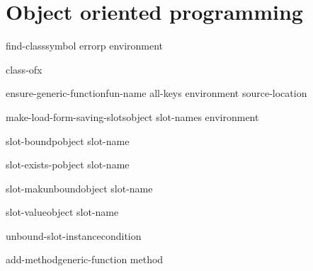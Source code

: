 \chapter{Object oriented programming}

\begin{accessor}{find-class}{symbol \op errorp environment}{}{}
  
\end{accessor}

\begin{function}{class-of}{x}{}{}
  
\end{function}

\begin{function}{ensure-generic-function}{fun-name \rest all-keys \key environment source-location \akeys}{}{}
  
\end{function}

\begin{function}{make-load-form-saving-slots}{object \key slot-names environment}{}{}
  
\end{function}

\begin{function}{slot-boundp}{object slot-name}{}{}
  
\end{function}

\begin{function}{slot-exists-p}{object slot-name}{}{}
  
\end{function}

\begin{function}{slot-makunbound}{object slot-name}{}{}
  
\end{function}

\begin{function}{slot-value}{object slot-name}{}{}
  
\end{function}

\begin{function}{unbound-slot-instance}{condition}{}{}
  
\end{function}

\begin{generic}{add-method}{generic-function method}{}{}
  
\end{generic}

